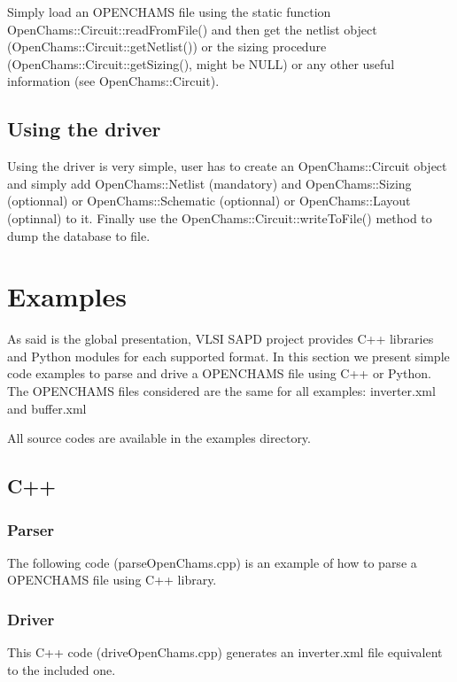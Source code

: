 Simply load an O\+P\+E\+N\+C\+H\+A\+MS file using the static function Open\+Chams\+::\+Circuit\+::read\+From\+File() and then get the netlist object (Open\+Chams\+::\+Circuit\+::get\+Netlist()) or the sizing procedure (Open\+Chams\+::\+Circuit\+::get\+Sizing(), might be N\+U\+LL) or any other useful information (see Open\+Chams\+::\+Circuit).\hypertarget{openchams_openChamsDriver}{}\subsection{Using the driver}\label{openchams_openChamsDriver}
Using the driver is very simple, user has to create an Open\+Chams\+::\+Circuit object and simply add Open\+Chams\+::\+Netlist (mandatory) and Open\+Chams\+::\+Sizing (optionnal) or Open\+Chams\+::\+Schematic (optionnal) or Open\+Chams\+::\+Layout (optinnal) to it. Finally use the Open\+Chams\+::\+Circuit\+::write\+To\+File() method to dump the database to file.\hypertarget{openchams_openChamsExamples}{}\section{Examples}\label{openchams_openChamsExamples}
As said is the global presentation, V\+L\+SI S\+A\+PD project provides C++ libraries and Python modules for each supported format. In this section we present simple code examples to parse and drive a O\+P\+E\+N\+C\+H\+A\+MS file using C++ or Python. The O\+P\+E\+N\+C\+H\+A\+MS files considered are the same for all examples\+: {\ttfamily inverter.\+xml} and {\ttfamily buffer.\+xml} 
\begin{DoxyCodeInclude}
\end{DoxyCodeInclude}
 
\begin{DoxyCodeInclude}
\end{DoxyCodeInclude}


All source codes are available in the {\ttfamily examples} directory.\hypertarget{openchams_openChamsC}{}\subsection{C++}\label{openchams_openChamsC}
\hypertarget{openchams_openChamsParseC}{}\subsubsection{Parser}\label{openchams_openChamsParseC}
The following code ({\ttfamily parse\+Open\+Chams.\+cpp}) is an example of how to parse a O\+P\+E\+N\+C\+H\+A\+MS file using C++ library. 
\begin{DoxyCodeInclude}
\end{DoxyCodeInclude}
\hypertarget{openchams_openChamsDriveC}{}\subsubsection{Driver}\label{openchams_openChamsDriveC}
This C++ code ({\ttfamily drive\+Open\+Chams.\+cpp}) generates an inverter.\+xml file equivalent to the included one. 
\begin{DoxyCodeInclude}
\end{DoxyCodeInclude}


